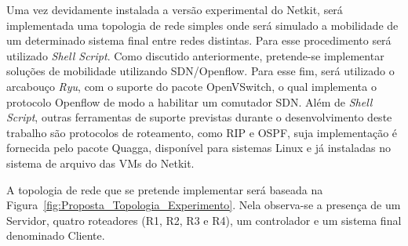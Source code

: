 \documentclass[	12pt, Times, openright, twoside, a4paper, english, brazil]{abntex2}
\begin{document}

Uma vez devidamente instalada a versão experimental do Netkit, será implementada uma topologia de rede simples onde será simulado a mobilidade de um determinado sistema final entre redes distintas. Para esse procedimento será utilizado \textit{Shell Script}. Como discutido anteriormente, pretende-se implementar soluções de mobilidade utilizando SDN/Openflow. Para esse fim, será utilizado o arcabouço \textit{Ryu}, com o suporte do pacote OpenVSwitch, o qual implementa o protocolo Openflow de modo a habilitar um comutador SDN. Além de \textit{Shell Script}, outras ferramentas de suporte previstas durante o desenvolvimento deste trabalho são protocolos de roteamento, como RIP e OSPF, suja implementação é fornecida pelo pacote Quagga, disponível para sistemas Linux e já instaladas no sistema de arquivo das VMs do Netkit.


A topologia de rede que se pretende implementar será baseada na Figura~\ref{fig:Proposta_Topologia_Experimento}. Nela observa-se a presença de um Servidor, quatro roteadores (R1, R2, R3 e R4), um controlador e um sistema final denominado Cliente.
\end{document}
